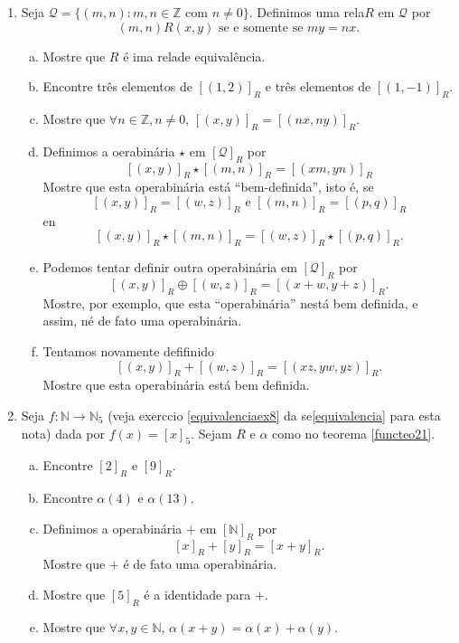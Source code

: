 \begin{enumerate}[{\bf 1.}]
\noindent \textit{\textbf{``Contraexemplo'':}} Sejam $A=\{1,2\}$, $B=\{1,2,3\}$ e $f:A\to B$ dada por $f(1)=1$ e $f(2)=1$. Ent\ao
\[
f^{-1}\bola f=\{(\varnothing,\varnothing),(\{1\},\{1,2\}), (\{1,2\},\{1,2\}), (\{2\},\{1,2\})\},
\]
que \'e sim\'etrica mas n\ao reflexiva.

\item Seja $\mathcal{Q}=\{(m,n): m,n\in \mathbb{Z} \textrm{ com } n\neq 0\}$. Definimos uma rela\cao $R$ em $\mathcal{Q}$ por
\[
(m,n)R(x,y) \textrm { se e somente se } my=nx.
\]
\begin{enumerate}[a)]
\item Mostre que $R$ \'e ima rela\cao de equival\^encia.
\item Encontre tr\^es elementos de $[(1,2)]_R$ e tr\^es elementos de $[(1,-1)]_R$.
\item Mostre que $\forall n\in\mathbb{Z}, n\neq 0$, $[(x,y)]_R=[(nx,ny)]_R$.
\item Definimos a oera\cao bin\'aria $\star$ em $[\mathcal{Q}]_R$ por
\[
[(x,y)]_R\star [(m,n)]_R=[(xm,yn)]_R
\]
Mostre que esta opera\cao bin\'aria est\'a ``bem-definida'', isto \'e, se
\[
[(x,y)]_R=[(w,z)]_R \textrm{ e } [(m,n)]_R=[(p,q)]_R
\]
en\tao
\[
[(x,y)]_R\star[(m,n)]_R=[(w,z)]_R\star[(p,q)]_R.
\]
\item Podemos tentar definir outra opera\cao bin\'aria em $[\mathcal{Q}]_R$ por
\[
[(x,y)]_R\oplus[(w,z)]_R=[(x+w,y+z)]_R.
\]
Mostre, por exemplo, que esta ``opera\cao bin\'aria'' n\ao est\'a bem definida, e assim, n\ao \'e de fato uma opera\cao bin\'aria.
\item  Tentamos novamente defifinido
\[
[(x,y)]_R+[(w,z)]_R=[(xz,yw,yz)]_R.
\]
Mostre que esta opera\cao bin\'aria est\'a bem definida.
\end{enumerate}

\indent [Nota: O leitor alerta pode ter feito a identifica\cao de $\mathcal{Q}$ com $\mathbb{Q}$, o conjunto dos n\'umeros racionais, com $m,n$ fazendo o papel de $m/n$. De fato, o que pensamos ser o n\'umero $1/2$ \'e realmente uma classe de esquival\^encia e igauldade de n\'umeros racionais \'e igualdade de classe de equival\^encia. Por isso no ensino b\'asico aprendemos que $1/2=3/6$.]

\item Seja $f:\mathbb{N}\to\mathbb{N}_5$ (veja exerc\ih cio \ref{equivalenciaex8} da se\cao \ref{equivalencia} para esta nota\caoi) dada por $f(x)=[x]_5$. Sejam $R$ e $\alpha$ como no teorema \ref{functeo21}.
\begin{enumerate}[a)]
\item Encontre $[2]_R$ e $[9]_R$.
\item Encontre $\alpha(4)$ e $\alpha(13)$.
\item Definimos a opera\cao bin\'aria $+$ em $[\mathbb{N}]_R$ por
\[
[x]_R+[y]_R=[x+y]_R.
\]
Mostre que $+$ \'e de fato uma opera\cao bin\'aria.
\item Mostre que $[5]_R$ \'e a identidade para $+$.
\item Mostre que $\forall x,y\in \mathbb{N}$, $\alpha(x+y)=\alpha(x)+\alpha(y)$.
\end{enumerate}
\end{enumerate}
